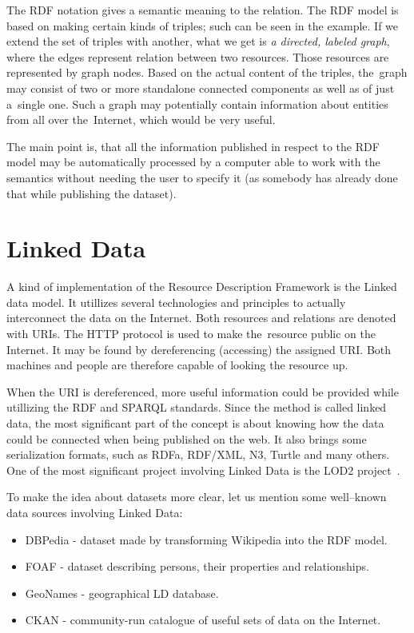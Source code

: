 The RDF notation gives a semantic meaning to the relation. The RDF model is based on making certain
kinds of triples; such can be seen in the example. If we extend the set of triples with another,
what we get is \emph{a directed, labeled graph}, where the edges represent relation between two resources.
Those resources are represented by graph nodes. Based on the actual content of the triples,
the~graph may consist of two or more standalone connected components as well as of
just a~single one. Such a graph may potentially contain information about entities from all over
the~Internet, which would be very useful.

The main point is, that all the information published in respect to the RDF model may be
automatically processed by a computer able to work with the semantics without
needing the user to specify it (as somebody has already done that while publishing the dataset).

\section{Linked Data}

A kind of implementation of the Resource Description Framework is the Linked data model.
It utillizes several technologies and principles to actually interconnect the data on the Internet.
Both resources and relations are denoted with URIs. The HTTP protocol is used to make
the~resource public on the Internet. It may be found by dereferencing (accessing) the assigned
URI. Both machines and people are therefore capable of looking the resource up.

When the URI is dereferenced, more useful information could be provided while utillizing the RDF
and SPARQL standards. Since the method is called linked data, the most significant part
of the concept is about knowing how the data could be connected when being published on the web.
It also brings some serialization formats, such as RDFa, RDF/XML, N3, Turtle and many others.
One of the most significant project involving Linked Data is the LOD2 project~\cite{lod2}.

To make the idea about datasets more clear, let us mention some well--known data sources
involving Linked Data:

\begin{itemize}
\item DBPedia - dataset made by transforming Wikipedia into the RDF model.
\item FOAF - dataset describing persons, their properties and relationships.
\item GeoNames - geographical LD database.
\item CKAN - community-run catalogue of useful sets of data on the Internet.
\end{itemize}


